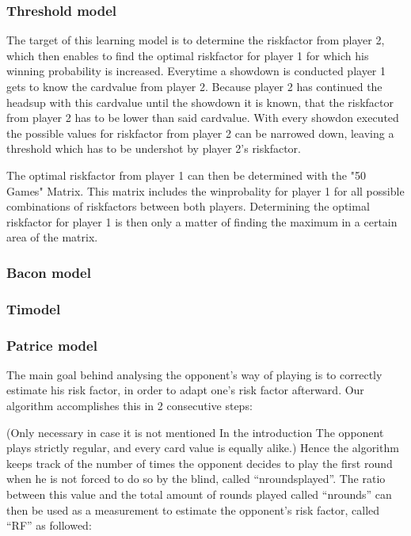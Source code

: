 \documentclass[11pt]{article}
\begin{document}
\subsubsection{Threshold model}

The target of this learning model is to determine the riskfactor from player 2, which then enables to find the optimal riskfactor for player 1 for which his winning probability is increased.
Everytime a showdown is conducted player 1 gets to know the cardvalue from player 2. Because player 2 has continued the headsup with this cardvalue until the showdown it is known, that the riskfactor from player 2 has to be lower than said cardvalue. With every showdon executed the possible values for riskfactor from player 2 can be narrowed down, leaving a threshold which has to be undershot by player 2's riskfactor.


The optimal riskfactor from player 1 can then be determined with the "50 Games" Matrix. This matrix includes the winprobality for player 1 for all possible combinations of riskfactors between both players. Determining the optimal riskfactor for player 1 is then only a matter of finding the maximum in a certain area of the matrix.




\subsubsection{Bacon model}
\subsubsection{Timodel}
\subsubsection{Patrice model}

The main goal behind analysing the opponent’s way of playing is to correctly estimate his risk factor, in order to adapt one’s risk factor afterward. 
Our algorithm accomplishes this in 2 consecutive steps:
 
(Only necessary in case it is not mentioned In the introduction The opponent plays strictly regular, and every card value is equally alike.) Hence the algorithm keeps track of the number of times the opponent decides to play the first round when he is not forced to do so by the blind, called “nroundsplayed”. The ratio between this value and the total amount of rounds played called “nrounds” can then be used as a measurement to estimate the opponent’s risk factor, called “RF” as followed:
 
\end{document}
